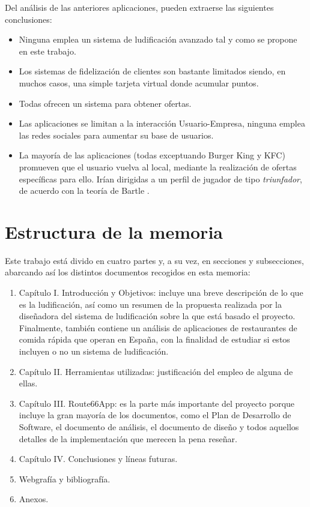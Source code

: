 \documentclass[twoside]{report}
\begin{document}
Del análisis de las anteriores aplicaciones, pueden extraerse las siguientes conclusiones:
\begin{itemize}

\item Ninguna emplea un sistema de ludificación avanzado tal y como se propone en este trabajo.

\item Los sistemas de fidelización de clientes son bastante limitados siendo, en muchos casos, una simple tarjeta virtual donde acumular puntos.

\item Todas ofrecen un sistema para obtener ofertas.

\item Las aplicaciones se limitan a la interacción Usuario-Empresa, ninguna emplea las redes sociales para aumentar su base de usuarios.

\item La mayoría de las aplicaciones (todas exceptuando Burger King y KFC) promueven que el usuario vuelva al local, mediante la realización de ofertas específicas para ello. Irían dirigidas a un perfil de jugador de tipo \textit{triunfador}, de acuerdo con la teoría de Bartle \cite{iebsctj}.
\end{itemize}

\section{Estructura de la memoria}

Este trabajo está divido en cuatro partes y, a su vez, en secciones y subsecciones, abarcando así los distintos documentos recogidos en esta memoria:

\begin{enumerate}
\item Capítulo I. Introducción y Objetivos: incluye una breve descripción de lo que es la ludificación, así como un resumen de la propuesta realizada por la diseñadora del sistema de ludificación sobre la que está basado el proyecto. Finalmente, también contiene un análisis de aplicaciones de restaurantes de comida rápida que operan en España, con la finalidad de estudiar si estos incluyen o no un sistema de ludificación.

\item Capítulo II. Herramientas utilizadas: justificación del empleo de alguna de ellas. 

\item Capítulo III. Route66App: es la parte más importante del proyecto porque incluye la gran mayoría de los documentos, como el Plan de Desarrollo de Software, el documento de análisis, el documento de diseño y todos aquellos detalles de la implementación que merecen la pena reseñar.

\item Capítulo IV. Conclusiones y líneas futuras.

\item Webgrafía y bibliografía.

\item Anexos.

\end{enumerate}
\end{document}
